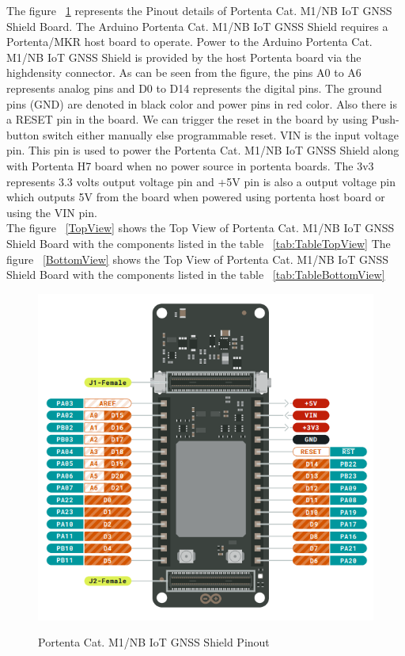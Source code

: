 The figure ~\ref{BoardPinout} represents the Pinout details of Portenta Cat. M1/NB IoT GNSS Shield Board. The Arduino Portenta Cat. M1/NB IoT GNSS Shield requires a Portenta/MKR host board to operate. Power to the Arduino Portenta Cat. M1/NB IoT GNSS Shield is provided by the host Portenta board via the highdensity connector.
As can be seen from the figure, the pins A0 to A6 represents analog pins and D0 to D14 represents the digital pins. The ground pins (GND) are denoted in black color and power pins in red color. Also there is a RESET pin in the board. We can trigger the reset in the board by using Push-button switch either manually else programmable reset. VIN is the input voltage pin. This pin is used to power the Portenta Cat. M1/NB IoT GNSS Shield along with Portenta H7 board when no power source in portenta boards. The 3v3 represents 3.3 volts output voltage pin and +5V pin is also a output voltage pin which outputs 5V from the board when powered using portenta host board or using the VIN pin. \cite{ArduinoPortenta:2024}
\\The figure ~\ref{TopView} shows the Top View of Portenta Cat. M1/NB IoT GNSS Shield Board with the components listed in the table ~\ref{tab:TableTopView} 
The figure ~\ref{BottomView} shows the Top View of Portenta Cat. M1/NB IoT GNSS Shield Board with the components listed in the table ~\ref{tab:TableBottomView} \cite{ArduinoPortenta:2024}


\begin{figure}[H]
	\begin{center}
		\includegraphics[width=0.7\linewidth]{Images/PotentaIoTGNSSShield/PortentaIoTGNSSShieldpinouts.png}
		\caption{Portenta Cat. M1/NB IoT GNSS Shield Pinout}
		\label{BoardPinout}
		\cite{ArduinoPortenta:2024}
	\end{center}
\end{figure}

